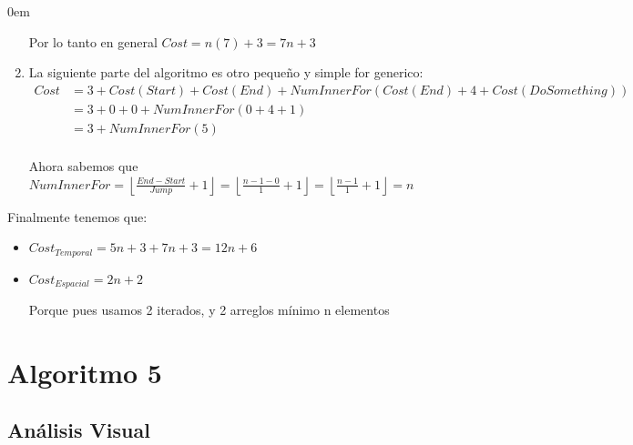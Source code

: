 \documentclass[12pt, fleqn]{article}                            %
\newenvironment{SmallIndentation}[1][0.75em]                    %
        {\begin{adjustwidth}{#1}{}\begin{footnotesize}}             %
        {\end{footnotesize}\end{adjustwidth}}                       %
\theoremstyle{break}                                            %
\newcommand{\Floor}[1]{\left \lfloor #1 \right \rfloor}         %
\begin{document}
\begin{SmallIndentation}[0em]
\begin{enumerate}
                Por lo tanto en general $Cost = n(7)+3 = 7n + 3$

            \item
                La siguiente parte del algoritmo es otro pequeño y simple for generico:
                \begin{align*}
                    Cost 
                        &= 3 + Cost(Start) + Cost(End) + NumInnerFor(Cost(End) + 4 + Cost(DoSomething))     \\
                        &= 3 + 0 + 0 + NumInnerFor(0 + 4 + 1)     \\
                        &= 3 + NumInnerFor(5)     \\
                \end{align*}

                Ahora sabemos que 
                $NumInnerFor 
                    = \Floor{\frac{End - Start}{Jump} + 1}
                    = \Floor{\frac{n - 1- 0}{1} + 1}
                    = \Floor{\frac{n-1}{1} + 1}
                    = n$

        \end{enumerate}

        Finalmente tenemos que:
        \begin{itemize}
            \item $Cost_{Temporal} = 5n + 3 + 7n + 3 = 12n + 6$
            \item $Cost_{Espacial} = 2n + 2$

                Porque pues usamos 2 iterados, y 2 arreglos mínimo n elementos
        \end{itemize}
            
    \end{SmallIndentation}



\clearpage
\section{Algoritmo 5}


    \subsection{Análisis Visual}
\end{document}

